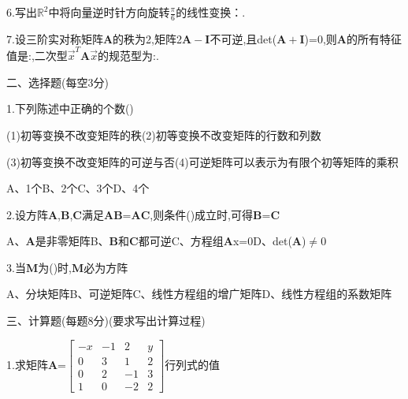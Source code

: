 \documentclass[a4paper]{article} %
\begin{document}
6.写出\(\mathbb{R}^2\)中将向量逆时针方向旋转\(\frac{\pi}{6}\)的线性变换：\underline{\hspace{2cm}}.

7.设三阶实对称矩阵\(\mathbf{A}\)的秩为2,矩阵2\(\mathbf{A-I}\)不可逆,且det(\(\mathbf{A+I}\))=0,则\(\mathbf{A}\)的所有特征值是:\underline{\hspace{2cm}},二次型\(\vec{x}^T\mathbf{A}\vec{x}\)的规范型为:\underline{\hspace{2cm}}.

二、选择题(每空3分)

1.下列陈述中正确的个数(\hspace{1cm})

(1)初等变换不改变矩阵的秩\hspace{0.3cm}(2)初等变换不改变矩阵的行数和列数

(3)初等变换不改变矩阵的可逆与否\hspace{0.3cm}(4)可逆矩阵可以表示为有限个初等矩阵的乘积

A、1个\hspace{1cm}B、2个\hspace{1cm}C、3个\hspace{1cm}D、4个

2.设方阵\(\mathbf{A}\),\(\mathbf{B}\),\(\mathbf{C}\)满足\(\mathbf{A}\)\(\mathbf{B}\)=\(\mathbf{A}\)\(\mathbf{C}\),则条件(\hspace{1cm})成立时,可得\(\mathbf{B}\)=\(\mathbf{C}\)

A、\(\mathbf{A}\)是非零矩阵\hspace{1cm}B、\(\mathbf{B}\)和\(\mathbf{C}\)都可逆\hspace{1cm}C、方程组\(\mathbf{A}\)x=0\hspace{1cm}D、det(\(\mathbf{A}\))\(\ne0\)

\clearpage%

3.当\(\mathbf{M}\)为(\hspace{1cm})时,\(\mathbf{M}\)必为方阵

A、分块矩阵\hspace{0.8cm}B、可逆矩阵\hspace{0.8cm}C、线性方程组的增广矩阵\hspace{0.8cm}D、线性方程组的系数矩阵

三、计算题(每题8分)(要求写出计算过程)

1.求矩阵\(\mathbf{A}\)=$\begin{bmatrix}-x&-1&2&y\\0&3&1&2\\0&2&-1&3\\1&0&-2&2\end{bmatrix}$行列式的值
\end{document}
